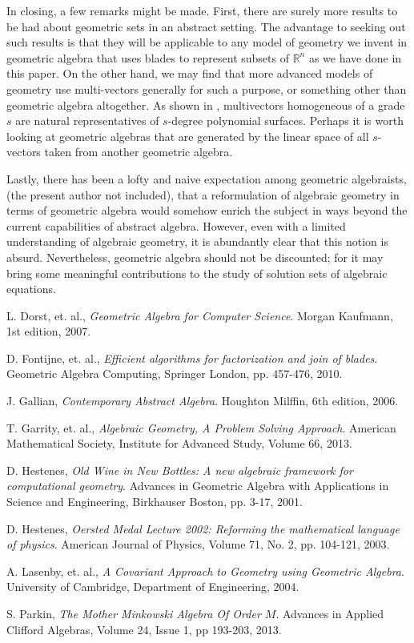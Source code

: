 \documentclass{birkjour}
\theoremstyle{definition}
\theoremstyle{remark}
\numberwithin{equation}{section}
\newcommand{\R}{\mathbb{R}}
\begin{document}
In closing, a few remarks might be made.  First, there are surely more results to be had
about geometric sets in an abstract setting.  The advantage to seeking out such
results is that they will be applicable to any model of geometry we invent
in geometric algebra that uses blades to represent subsets of $\R^n$ as we have
done in this paper.  On the other hand,
we may find that more advanced models of geometry use multi-vectors generally
for such a purpose, or something other than geometric algebra altogether.
As shown in \cite{Parkin13}, multivectors homogeneous of a grade $s$ are
natural representatives of $s$-degree polynomial surfaces.  Perhaps it is
worth looking at geometric algebras that are generated by the linear space
of all $s$-vectors taken from another geometric algebra.

Lastly, there has been a
lofty and naive expectation among geometric algebraists, (the present author not included),
that a reformulation of algebraic geometry in terms of geometric algebra would somehow enrich the subject
in ways beyond the current capabilities of abstract algebra.  However, even with a limited understanding
of algebraic geometry, it is abundantly clear that this notion is absurd.  Nevertheless,
geometric algebra should not be discounted; for it may bring some meaningful
contributions to the study of solution sets of algebraic equations.

\begin{thebibliography}{9}

L. Dorst, et. al.,
\emph{Geometric Algebra for Computer Science}.
Morgan Kaufmann, 1st edition, 2007.

D. Fontijne, et. al.,
\emph{Efficient algorithms for factorization and join of blades}.
Geometric Algebra Computing, Springer London, pp. 457-476, 2010.

J. Gallian,
\emph{Contemporary Abstract Algebra}.
Houghton Milffin, 6th edition, 2006.

T. Garrity, et. al.,
\emph{Algebraic Geometry, A Problem Solving Approach}.
American Mathematical Society, Institute for Advanced Study,
Volume 66, 2013.

D. Hestenes,
\emph{Old Wine in New Bottles: A new algebraic framework for computational geometry}.
Advances in Geometric Algebra with Applications in Science and Engineering,
Birkhauser Boston, pp. 3-17, 2001.

D. Hestenes,
\emph{Oersted Medal Lecture 2002: Reforming the mathematical language of physics}.
American Journal of Physics, Volume 71, No. 2, pp. 104-121, 2003.

A. Lasenby, et. al.,
\emph{A Covariant Approach to Geometry using Geometric Algebra}.
University of Cambridge, Department of Engineering, 2004.

S. Parkin,
\emph{The Mother Minkowski Algebra Of Order $M$}.
Advances in Applied Clifford Algebras, Volume 24, Issue 1, pp 193-203, 2013.

\end{thebibliography}
\end{document}
